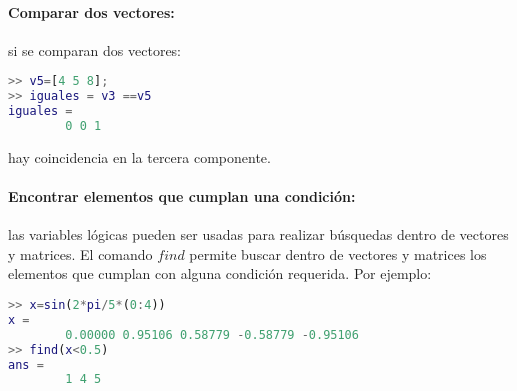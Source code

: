 \paragraph{Comparar dos vectores:} si se comparan dos vectores:
\begin{lstlisting}[language=Matlab]
>> v5=[4 5 8];
>> iguales = v3 ==v5
iguales =
		0 0 1
\end{lstlisting}
hay coincidencia en la tercera componente.

\paragraph{Encontrar elementos que cumplan una condición:}las variables lógicas pueden ser usadas para realizar búsquedas dentro de vectores y matrices. El comando $find$ permite buscar dentro de vectores y matrices los elementos que cumplan con alguna condición requerida. Por ejemplo:
\begin{lstlisting}[language=Matlab]
>> x=sin(2*pi/5*(0:4))
x =
		0.00000 0.95106 0.58779 -0.58779 -0.95106
>> find(x<0.5)
ans =
		1 4 5
\end{lstlisting}
